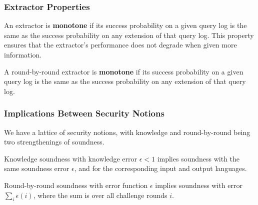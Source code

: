 \subsubsection{Extractor Properties}

\begin{definition}
    \label{def:monotone_straightline_extractor}
    An extractor is \textbf{monotone} if its success probability on a given query log is the same as
    the success probability on any extension of that query log. This property ensures that the extractor's
    performance does not degrade when given more information.
\end{definition}

\begin{definition}
    \label{def:monotone_rbr_extractor}
    A round-by-round extractor is \textbf{monotone} if its success probability on a given query log
    is the same as the success probability on any extension of that query log.
\end{definition}

\subsubsection{Implications Between Security Notions}

We have a lattice of security notions, with knowledge and round-by-round being two strengthenings of soundness.

\begin{theorem}
    \label{thm:knowledge_soundness_implies_soundness}
    Knowledge soundness with knowledge error $\epsilon < 1$ implies soundness with the same
    soundness error $\epsilon$, and for the corresponding input and output languages.
\end{theorem}

\begin{theorem}
    \label{thm:rbr_soundness_implies_soundness}
    Round-by-round soundness with error function $\epsilon$ implies soundness with error
    $\sum_i \epsilon(i)$, where the sum is over all challenge rounds $i$.
\end{theorem}

